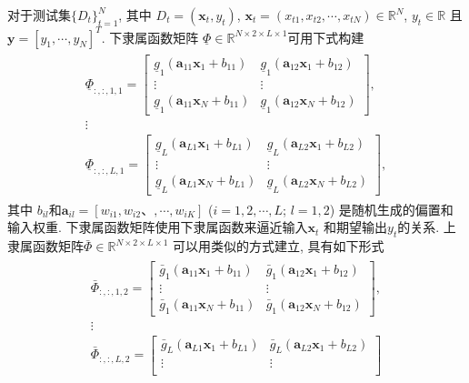 {对于测试集$\{D_t\} _{t=1} ^{N} $, 其中 $D_t=(\bm x_t,y_t)$, $\bm x_t=(x_{t1} ,x_{t2} ,\cdots,x_{tN} )\in \mathbb R^{N} $, $y_t\in \mathbb R$ 且$\bm y=[y_1,\cdots, y_N]^T$. 下隶属函数矩阵 $\underline\Phi\in \mathbb R^{N\times 2\times L \times 1} $可用下式构建
\begin{align*}
\begin{array} {cc}
 \underline\Phi_{:,:,1,1}  =\begin{bmatrix}
  \underline g_1(\bm {a} _{11}  \bm x_1+b_{11} )&\underline g_1(\bm {a} _{12}  \bm x_1+b_{12} )\\
   \vdots&\vdots\\
  \underline g_1(\bm {a} _{11}  \bm x_N+b_{11} )&\underline g_1(\bm {a} _{12}  \bm x_N+b_{12} )
\end{bmatrix},\\
\vdots\\
   \underline\Phi_{:,:,L,1}  =\begin{bmatrix}
  \underline g_L(\bm {a} _{L1}  \bm x_1+b_{L1} )&\underline g_L(\bm {a} _{L2}  \bm x_1+b_{L2} )\\
   \vdots&\vdots\\
  \underline g_L(\bm {a} _{L1}  \bm x_N+b_{L1} )&\underline g_L(\bm {a} _{L2}  \bm x_N+b_{L2} )
\end{bmatrix},
\end{array}
\end{align*}
其中 $b_{il} $和$\bm {a} _{il} =[w_{i1} ,w_{i2} 、,\cdots,w_{iK} ]$ ($i=1, 2, \cdots, L$; $l=1,2$) 是随机生成的偏置和输入权重. 下隶属函数矩阵使用下隶属函数来逼近输入$\bm x_t$ 和期望输出$y_t$的关系.
上隶属函数矩阵$\bar \Phi\in \mathbb R^{N\times 2\times L \times 1}$ 可以用类似的方式建立, 具有如下形式
\begin{align*}
 \begin{array} {cc}
 \bar\Phi_{:,:,1,2}  =\begin{bmatrix}
  \bar g_1(\bm {a} _{11}  \bm x_1+b_{11} )&\bar g_1(\bm {a} _{12}  \bm x_1+b_{12} )\\
   \vdots&\vdots\\
  \bar g_1(\bm {a} _{11}  \bm x_N+b_{11} )&\bar g_1(\bm {a} _{12}  \bm x_N+b_{12} )
\end{bmatrix},\\
\vdots\\
   \bar\Phi_{:,:,L,2}  =\begin{bmatrix}
  \bar g_L(\bm {a} _{L1}  \bm x_1+b_{L1} )&\bar g_L(\bm {a} _{L2}  \bm x_1+b_{L2} )\\
   \vdots&\vdots\\

\end{bmatrix}
\end{array}
\end{align*}}
